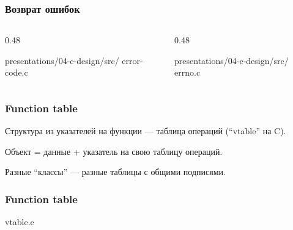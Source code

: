 \documentclass[compress, 8pt, aspectratio=169]{beamer}
\begin{document}
\begin{frame}[fragile]

    \frametitle{Возврат ошибок}

    \begin{columns}[T]

        \begin{column}{0.48\textwidth}

                {presentations/04-c-design/src/}
                {error-code.c}

        \end{column}

        \begin{column}{0.48\textwidth}

                {presentations/04-c-design/src/}
                {errno.c}

        \end{column}

    \end{columns}

\end{frame}

\begin{frame}[fragile]

    \frametitle{Function table}

    \begin{myitemize}

        \item Структура из указателей на функции --- таблица
            операций (\enquote{vtable} на C).

        \item Объект = данные + указатель на свою
            таблицу операций.

        \item Разные \enquote{классы} --- разные таблицы
            с общими подписями.

    \end{myitemize}

\end{frame}

\begin{frame}[fragile]

    \frametitle{Function table}

        {vtable.c}

\end{frame}
\end{document}
